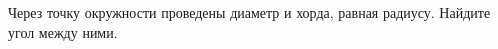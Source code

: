 \begin{ex}
	\begin{condition}
		Через точку окружности проведены диаметр и хорда, равная радиусу. Найдите угол между ними.
	\end{condition}
\end{ex}